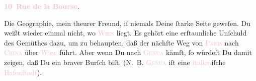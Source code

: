            \pstart
           \begin{otherlanguage}{french}\textcolor{gray}{\textbf{\textbf{\textcolor{pink}{10 Rue de la Bourse}{}\ledrightnote{\textcolor{pink}{rue de la Bourse}}.}}}\end{otherlanguage}\pend
           \pstart
           Die Geographie, mein theurer Freund, iſ niemals Deine
               ſtarke Seite geweſen. Du weißt wieder einmal nicht, wo \textsc{\textcolor{pink}{Wien}{}\ledrightnote{\textcolor{pink}{Wien}}} liegt. Es gehört eine erſtaunliche Unſchuld des Gemüthes dazu, um zu behaupten,
               daß der nächſte Weg von \textsc{\textcolor{pink}{Paris}{}\ledrightnote{\textcolor{pink}{Paris}}} nach \textsc{\textcolor{pink}{China}{}\ledrightnote{\textcolor{pink}{China}}} über 
                  \textcolor{pink}{Wien}{}\ledrightnote{\textcolor{pink}{Wien}}
                führt. Aber wenn Du nach \textsc{\textcolor{pink}{Genua}{}\ledrightnote{\textcolor{pink}{Genua}}} kämſt, ſo würdeſt Du damit zeigen, daß Du ein\pend
           \pstart
           braver Burſch biſt.
               \introOben{}(\textsc{N. B. \textcolor{pink}{Genua}{}\ledrightnote{\textcolor{pink}{Genua}}} iſt eine \textcolor{pink}{italien}{}\ledrightnote{\textcolor{pink}{Italien}}iſche \textcolor{pink}{Hafenſtadt}{}).\introOben{}\pend
           \pstart
           
